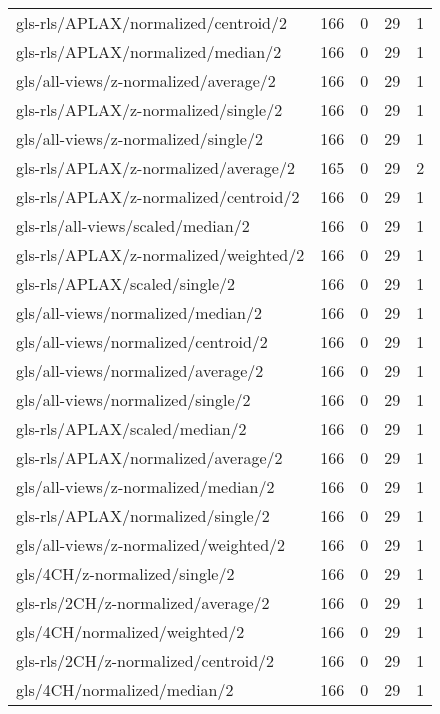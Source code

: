 \begin{longtable}{lrrrr}
    gls-rls/APLAX/normalized/centroid/2       & 166 &  0 & 29 &  1 \\
    gls-rls/APLAX/normalized/median/2         & 166 &  0 & 29 &  1 \\
    gls/all-views/z-normalized/average/2      & 166 &  0 & 29 &  1 \\
    gls-rls/APLAX/z-normalized/single/2       & 166 &  0 & 29 &  1 \\
    gls/all-views/z-normalized/single/2       & 166 &  0 & 29 &  1 \\
    gls-rls/APLAX/z-normalized/average/2      & 165 &  0 & 29 &  2 \\
    gls-rls/APLAX/z-normalized/centroid/2     & 166 &  0 & 29 &  1 \\
    gls-rls/all-views/scaled/median/2         & 166 &  0 & 29 &  1 \\
    gls-rls/APLAX/z-normalized/weighted/2     & 166 &  0 & 29 &  1 \\
    gls-rls/APLAX/scaled/single/2             & 166 &  0 & 29 &  1 \\
    gls/all-views/normalized/median/2         & 166 &  0 & 29 &  1 \\
    gls/all-views/normalized/centroid/2       & 166 &  0 & 29 &  1 \\
    gls/all-views/normalized/average/2        & 166 &  0 & 29 &  1 \\
    gls/all-views/normalized/single/2         & 166 &  0 & 29 &  1 \\
    gls-rls/APLAX/scaled/median/2             & 166 &  0 & 29 &  1 \\
    gls-rls/APLAX/normalized/average/2        & 166 &  0 & 29 &  1 \\
    gls/all-views/z-normalized/median/2       & 166 &  0 & 29 &  1 \\
    gls-rls/APLAX/normalized/single/2         & 166 &  0 & 29 &  1 \\
    gls/all-views/z-normalized/weighted/2     & 166 &  0 & 29 &  1 \\
    gls/4CH/z-normalized/single/2             & 166 &  0 & 29 &  1 \\
    gls-rls/2CH/z-normalized/average/2        & 166 &  0 & 29 &  1 \\
    gls/4CH/normalized/weighted/2             & 166 &  0 & 29 &  1 \\
    gls-rls/2CH/z-normalized/centroid/2       & 166 &  0 & 29 &  1 \\
    gls/4CH/normalized/median/2               & 166 &  0 & 29 &  1 \\

\end{longtable}
